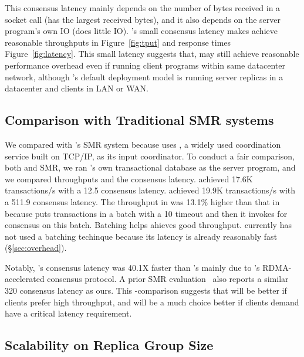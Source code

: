 This consensus latency mainly depends on the number of bytes received in a 
socket call (\mongodb has the largest received bytes), and it also depends on 
the server program's own IO (\redis does little IO). \xxx's small consensus 
latency makes \xxx achieve reasonable throughputs in Figure~\ref{fig:tput} 
and response times Figure~\ref{fig:latency}. This small latency suggests that, 
\xxx may still achieve reasonable performance overhead even if running client 
programs within same datacenter network, although \xxx's default deployment 
model is running server replicas in a datacenter and clients in LAN or WAN.

\subsection{Comparison with Traditional SMR systems} \label{sec:compare}

We compared \xxx with \calvin's SMR system because \calvin uses \zookeeper, a 
widely used coordination service built on TCP/IP, as its input coordinator. To 
conduct a fair comparison, both \xxx and \calvin SMR, we ran \calvin's own 
transactional database as the server program, and we compared throughputs and 
the consensus latency. \xxx achieved 17.6K transactions/s with a 12.5 \us 
consensus latency. \calvin achieved 19.9K transactions/s with a 511.9 \us 
consensus latency. The throughput in \calvin was 13.1\% higher than that in
\xxx because \calvin puts transactions in a batch with a 10 \ms timeout and 
then it invokes \zookeeper for consensus on this batch. Batching helps \calvin 
ahieves good throughput. \xxx currently has not used a batching techinque 
because its latency is already reasonably fast (\S\ref{sec:overhead}).

Notably, \xxx's consensus latency was 40.1X faster than \zookeeper's mainly due 
to \xxx's RDMA-accelerated consensus protocol. A prior SMR
evaluation~\cite{dare:hpdc15} also reports a similar 320 \us \zookeeper 
consensus latency as ours. This \xxx-\calvin comparison suggests that \calvin 
will be better if clients prefer high throughput, and \xxx will be a 
much choice better if clients demand have a critical latency requirement.


\subsection{Scalability on Replica Group Size} \label{sec:scalability}

